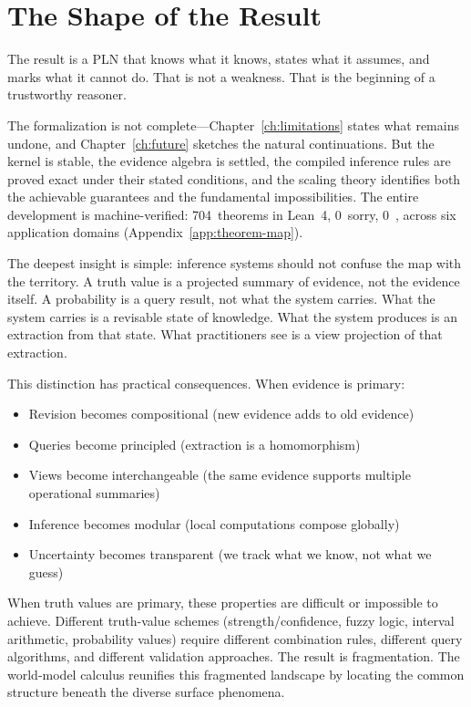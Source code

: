 \documentclass[11pt,openany]{report}
\begin{document}
\section{The Shape of the Result}

The result is a PLN that knows what it knows, states what it assumes,
and marks what it cannot do.  That is not a weakness.  That is the
beginning of a trustworthy reasoner.

The formalization is not complete---Chapter~\ref{ch:limitations}
states what remains undone, and Chapter~\ref{ch:future} sketches the
natural continuations.  But the kernel is stable, the evidence algebra
is settled, the compiled inference rules are proved exact under their
stated conditions, and the scaling theory identifies both the
achievable guarantees and the fundamental impossibilities.
The entire development is machine-verified: 704~theorems in Lean~4,
0~sorry, 0~, across six application domains
(Appendix~\ref{app:theorem-map}).

The deepest insight is simple: inference systems should not confuse the
map with the territory.  A truth value is a projected summary of
evidence, not the evidence itself.  A probability is a query result,
not what the system carries.  What the system carries is a revisable
state of knowledge.  What the system produces is an extraction from
that state.  What practitioners see is a view projection of that
extraction.

This distinction has practical consequences.  When evidence is primary:
\begin{itemize}
\item Revision becomes compositional (new evidence adds to old
  evidence)
\item Queries become principled (extraction is a homomorphism)
\item Views become interchangeable (the same evidence supports
  multiple operational summaries)
\item Inference becomes modular (local computations compose globally)
\item Uncertainty becomes transparent (we track what we know, not
  what we guess)
\end{itemize}

\noindent
When truth values are primary, these properties are difficult or
impossible to achieve.  Different truth-value schemes
(strength/confidence, fuzzy logic, interval arithmetic, probability
values) require different combination rules, different query
algorithms, and different validation approaches.  The result is
fragmentation.  The world-model calculus reunifies this fragmented
landscape by locating the common structure beneath the diverse surface
phenomena.
\end{document}
